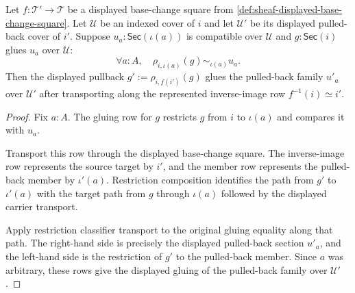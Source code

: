 \begin{theorem}
\label{thm:sheaf-base-change-gluing-pullback}
Let $f:\mathcal{T}'\to\mathcal{T}$ be a displayed base-change square from \autoref{def:sheaf-displayed-base-change-square}. Let $\mathcal{U}$ be an indexed cover of $i$ and let $\mathcal{U}'$ be its displayed pulled-back cover of $i'$. Suppose $u_a:\mathsf{Sec}(\iota(a))$ is compatible over $\mathcal{U}$ and $g:\mathsf{Sec}(i)$ glues $u_a$ over $\mathcal{U}$:
$$
\forall a:A,\quad
\rho_{i,\iota(a)}(g)\sim_{\iota(a)}u_a.
$$
Then the displayed pullback $g':=\rho_{i,f(i')}(g)$ glues the pulled-back family $u'_a$ over $\mathcal{U}'$ after transporting along the represented inverse-image row $f^{-1}(i)\simeq i'$.
\end{theorem}
\begin{proof}
Fix $a:A$. The gluing row for $g$ restricts $g$ from $i$ to $\iota(a)$ and compares it with $u_a$.

Transport this row through the displayed base-change square. The inverse-image row represents the source target by $i'$, and the member row represents the pulled-back member by $\iota'(a)$. Restriction composition identifies the path from $g'$ to $\iota'(a)$ with the target path from $g$ through $\iota(a)$ followed by the displayed carrier transport.

Apply restriction classifier transport to the original gluing equality along that path. The right-hand side is precisely the displayed pulled-back section $u'_a$, and the left-hand side is the restriction of $g'$ to the pulled-back member. Since $a$ was arbitrary, these rows give the displayed gluing of the pulled-back family over $\mathcal{U}'$.
\end{proof}

